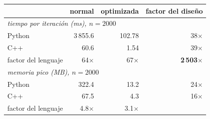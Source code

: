 \begin{tabular}{lrrr}
\toprule
 & normal & optimizada & factor del diseño \\
\midrule
\multicolumn{4}{l}{\emph{tiempo por iteración (ms), $n=2000$}} \\
Python & 3\,855.6 & 102.78 & 38$\times$ \\
C++ & 60.6 & 1.54 & 39$\times$ \\
factor del lenguaje & 64$\times$ & 67$\times$ & \textbf{2\,503$\times$} \\
\midrule
\multicolumn{4}{l}{\emph{memoria pico (MB), $n=2000$}} \\
Python & 322.4 & 13.2 & 24$\times$ \\
C++ & 67.5 & 4.3 & 16$\times$ \\
factor del lenguaje & 4.8$\times$ & 3.1$\times$ & \\
\bottomrule
\end{tabular}
